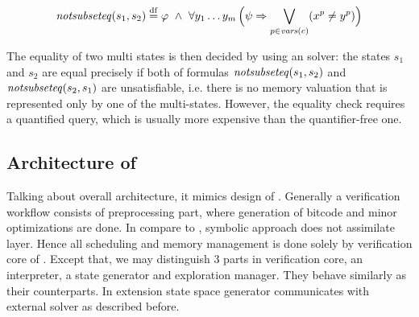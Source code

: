 \[
  \mathit{notsubseteq}(s_1, s_2) \stackrel{\mathrm{df}}{=} \varphi~\land~ \forall y_1 \ldots y_m
  \, \Big ( \psi \Rightarrow \bigvee_{p \in \mathit{vars}(c)} (x^p \not =
  y^p) \Big)
\]

The equality of two multi states is then decided by using an \SMT solver:
the states $s_1$ and $s_2$ are equal precisely if both of
formulas $\mathit{notsubseteq}(s_1, s_2)$ and $\mathit{notsubseteq}(s_2, s_1)$ are
unsatisfiable, i.e. there is no memory valuation that is represented
only by one of the multi-states. However, the equality check requires
a quantified \SMT query, which is usually more expensive than the
quantifier-free one.


\subsection{Architecture of \SymDIVINE}
Talking about \SymDIVINE overall architecture, it mimics design of \DIVINE.
Generally a verification workflow consists of preprocessing part, where
generation of \LLVM bitcode and minor optimizations are done. In compare to
\DIVINE, symbolic approach does not assimilate \DIOS layer. Hence all scheduling
and memory management is done solely by verification core of \SymDIVINE. Except
that, we may distinguish 3 parts in verification core, an interpreter, a state
generator and exploration manager. They behave similarly as their \DIVINE
counterparts. In extension state space generator communicates with external
\SMT solver as described before.

